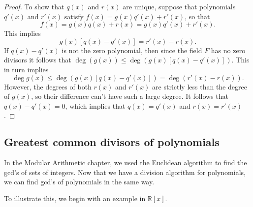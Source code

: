 \begin{proof}
To show that  $q(x)$ and $r(x)$ are unique, suppose that polynomials $q'(x)$ and $r'(x)$ satisfy $f(x) = g(x) q'(x)
+ r'(x)$, so that
\[
f(x) = g(x) q(x) + r(x) = g(x) q'(x) + r'(x).
\]
This implies
\[
g(x) [q(x) - q'(x) ] = r'(x) - r(x).
\]
If $q(x) - q'(x)$ is not the zero polynomial, then since the field $F$ has no zero divisors it follows that $ \deg( g(x)) \leq \deg( g(x) [q(x) - q'(x) ])$. This in turn implies
\[
\deg g(x) \leq \deg( g(x) [q(x) - q'(x) ] )= \deg( r'(x) - r(x) ).
\]
However, the degrees of both $r(x)$ and $r'(x)$ are strictly less than
the degree of $g(x)$, so their difference can't have such a large degree.  It follows that $q(x) - q'(x) = 0$, which implies that $q(x)=q'(x)$ and $r(x)=r'(x)$.
\end{proof}

\subsection{Greatest common divisors of polynomials}
In the Modular Arithmetic chapter, we used the Euclidean algorithm to find the gcd's of sets of integers. Now that we have a division algorithm for polynomials, we can find gcd's of polynomials in the same way. 

To illustrate this, we begin with an example in $\mathbb{R}[x]$.

